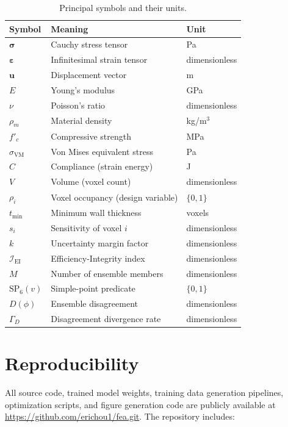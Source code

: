 \documentclass[11pt]{article}
\theoremstyle{plain}
\theoremstyle{definition}
\theoremstyle{remark}
\begin{document}
\begin{table}[h]
\centering
\caption{Principal symbols and their units.}
\label{tab:symbols}
\small
\begin{tabular}{@{}lll@{}}
\toprule
\textbf{Symbol} & \textbf{Meaning} & \textbf{Unit} \\
\midrule
$\boldsymbol{\sigma}$ & Cauchy stress tensor & Pa \\
$\boldsymbol{\varepsilon}$ & Infinitesimal strain tensor & dimensionless \\
$\mathbf{u}$ & Displacement vector & m \\
$E$ & Young's modulus & GPa \\
$\nu$ & Poisson's ratio & dimensionless \\
$\rho_m$ & Material density & kg/m$^3$ \\
$f'_c$ & Compressive strength & MPa \\
$\sigma_{\mathrm{VM}}$ & Von Mises equivalent stress & Pa \\
$C$ & Compliance (strain energy) & J \\
$V$ & Volume (voxel count) & dimensionless \\
$\rho_i$ & Voxel occupancy (design variable) & $\{0, 1\}$ \\
$t_{\min}$ & Minimum wall thickness & voxels \\
$s_i$ & Sensitivity of voxel $i$ & dimensionless \\
$k$ & Uncertainty margin factor & dimensionless \\
$\mathcal{I}_{\mathrm{EI}}$ & Efficiency-Integrity index & dimensionless \\
$M$ & Number of ensemble members & dimensionless \\
$\mathrm{SP}_6(v)$ & Simple-point predicate & $\{0, 1\}$ \\
$D(\phi)$ & Ensemble disagreement & dimensionless \\
$\Gamma_D$ & Disagreement divergence rate & dimensionless \\
\bottomrule
\end{tabular}
\end{table}

\section{Reproducibility}
\label{app:reproducibility}

All source code, trained model weights, training data generation pipelines, optimization scripts, and figure generation code are publicly available at \url{https://github.com/erichou1/fea.git}. The repository includes:
\end{document}
